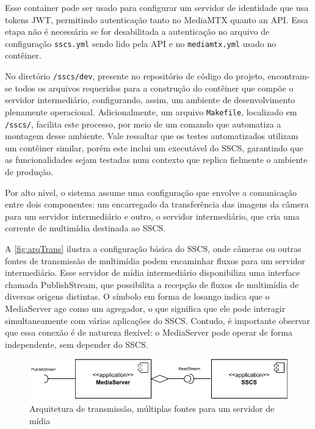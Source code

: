 \documentclass[12pt, %
openright, 
oneside, %
a4paper,    %
brazil]{facom-ufu-abntex2}
\begin{document}
Esse container pode ser usado para configurar um servidor de identidade que usa
tokens JWT, permitindo autenticação tanto no MediaMTX quanto an API. Essa etapa
não é necessária se for desabilitada a autenticação no arquivo de configuração
\texttt{sscs.yml} sendo lido pela API e no \texttt{mediamtx.yml} usado no
contêiner.

No diretório \texttt{/sscs/dev}, presente no repositório de código do projeto,
encontram-se todos os arquivos requeridos para a construção do contêiner que
compõe o servidor intermediário, configurando, assim, um ambiente de
desenvolvimento plenamente operacional. Adicionalmente, um arquivo
\texttt{Makefile}, localizado em \texttt{/sscs/}, facilita este processo, por
meio de um comando que automatiza a montagem desse ambiente. Vale ressaltar que
os testes automatizados utilizam um contêiner similar, porém este inclui um
executável do SSCS, garantindo que as funcionalidades sejam testadas num
contexto que replica fielmente o ambiente de produção.

Por alto nível, o sistema assume uma configuração que envolve a comunicação
entre dois componentes: um encarregado da transferência das imagens da câmera
para um servidor intermediário e outro, o servidor intermediário, que cria uma
corrente de multimídia destinada ao SSCS.

A \autoref{fig:arqTrans} ilustra a configuração básica do SSCS, onde câmeras ou
outras fontes de transmissão de multimídia podem encaminhar fluxos para um
servidor intermediário. Esse servidor de mídia intermediário disponibiliza uma
interface chamada PublishStream, que possibilita a recepção de fluxos de
multimídia de diversas origens distintas. O símbolo em forma de losango indica
que o MediaServer age como um agregador, o que significa que ele pode interagir
simultaneamente com várias aplicações do SSCS. Contudo, é importante observar
que essa conexão é de natureza flexível: o MediaServer pode operar de forma
independente, sem depender do SSCS.

\begin{figure}[!ht]
	\centering
	\includegraphics[width=1\linewidth]{arch1.pdf}
	\caption[Exemplo de arquitetura de transmissão]{Arquitetura de
		transmissão, múltiplas fontes para um servidor de mídia}
	\label{fig:arqTrans}
\end{figure}
\end{document}
